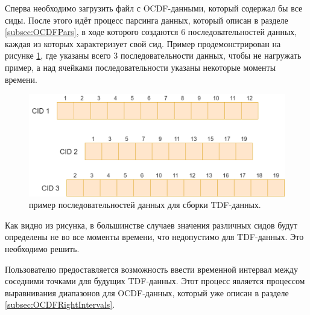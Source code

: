 {\standartFont

  \par Сперва необходимо загрузить файл с OCDF-данными, который содержал бы все сиды. После этого идёт процесс парсинга данных, который описан в разделе \ref{subsec:OCDFPars}, в ходе которого создаются 6 последовательностей данных, каждая из которых характеризует свой сид. Пример продемонстрирован на рисунке \ref{fig:CreateTDFstage1}, где указаны всего 3 последовательности данных, чтобы не нагружать пример, а над ячейками последовательности указаны некоторые моменты времени. 

  \begin{figure}[H]
    \centering
    \includegraphics[width=\textwidth]{images/forDataManipulator/CreateTDFstage1.drawio.png}
    \caption{пример последовательностей данных для сборки TDF-данных.} 
    \label{fig:CreateTDFstage1}
  \end{figure}

  \par Как видно из рисунка, в большинстве случаев значения различных сидов будут определены не во все моменты времени, что недопустимо для TDF-данных. Это необходимо решить.

  \par Пользователю предоставляется возможность ввести временной интервал между соседними точками для будущих TDF-данных. Этот процесс является процессом выравнивания диапазонов для OCDF-данных, который уже описан в разделе \ref{subsec:OCDFRightIntervals}.

}
